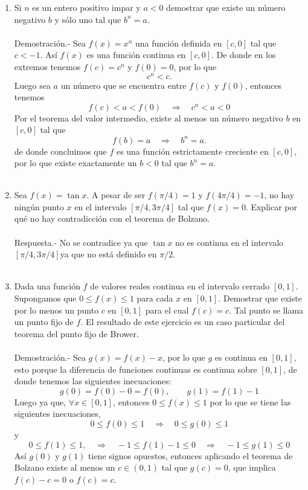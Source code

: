 \begin{enumerate}[\bfseries 1.]
    \item Si $n$ es un entero positivo impar y $a<0$ demostrar que existe un número negativo $b$ y sólo uno tal que $b^n = a.$\\\\
	Demostración.-\; Sea $f(x)=x^n$ una función definida en $[c,0]$ tal que $c<-1$. Así $f(x)$ es una función continua en $[c,0]$. De donde en los extremos tenemos $f(c)=c^n$ y $f(0)=0$, por lo que 
	$$c^n<c.$$
	Luego sea $a$ un número que se encuentra entre $f(c)$ y $f(0)$, entonces tenemos
	$$f(c)<a<f(0)\quad \Rightarrow \quad c^n < a < 0$$
	Por el teorema del valor intermedio, existe al menos un número negativo $b$ en $[c,0]$ tal que 
	$$f(b)=a\quad \Rightarrow \quad b^n = a.$$
	de donde concluimos que $f$ es una función estrictamente creciente en $[c,0]$, por lo que existe exactamente un $b<0$ tal que $b^n=a$.\\\\ 

    \item Sea $f(x)=\tan x$. A pesar de ser $f(\pi/4)=1$ y $f(4\pi/4)=-1$, no hay ningún punto $x$ en el intervalo $[\pi/4,3\pi/4]$ tal que $f(x)=0$. Explicar por qué no hay contradicción con el teorema de Bolzano.\\\\
	Respuesta.- No se contradice ya que $\tan x$ no es continua en el intervalo $[\pi/4,3\pi/4]$ya que no está definido en $\pi/2$.\\\\

    \item Dada una función $f$ de valores reales continua en el intervalo cerrado $[0,1]$. Supongamos que $0\leq f(x)\leq 1$ para cada $x$ en $[0,1]$. Demostrar que existe por lo menos un punto $c$ en $[0,1]$ para el cual $f(c)=c$. Tal punto se llama un punto fijo de $f$. El resultado de este ejercicio es un caso particular del teorema del punto fijo de Brower.\\\\
	Demostración.-\; Sea $g(x)=f(x)-x$, por lo que $g$ es continua en $[0,1]$, esto porque la diferencia de funciones continuas es continua sobre $[0,1]$, de donde tenemos las siguientes inecuaciones:
	$$g(0)=f(0)-0=f(0), \qquad  g(1)=f(1)-1$$
	Luego ya que, $\forall x \in [0,1]$, entonces $0\leq f(x)\leq 1$ por lo que se tiene las siguientes inecuaciones,
	$$0\leq f(0)\leq 1\quad \Rightarrow  \quad  0\leq g(0)\leq 1$$
	y
	$$0 \leq f(1)\leq 1,\quad \Rightarrow \quad -1\leq f(1)-1\leq 0 \quad \Rightarrow \quad -1\leq g(1)\leq 0$$
	Así $g(0)$ y $g(1)$ tiene signos opuestos, entonces aplicando el teorema de Bolzano existe al menos un $c \in (0,1)$ tal que $g(c)=0$, que implica $f(c)-c=0$ o $f(c)=c$.\\\\



\end{enumerate}
